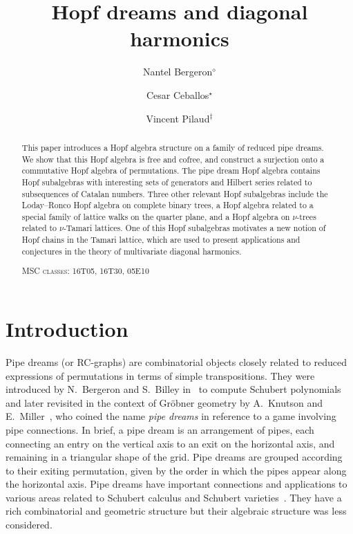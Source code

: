 \documentclass{amsart}
\title{Hopf dreams and diagonal harmonics}
\author[N.~Bergeron]{Nantel Bergeron$^{\diamond}$}
\author[C.~Ceballos]{Cesar Ceballos$^{\star}$}
\author[V.~Pilaud]{Vincent Pilaud$^{\ddagger}$}
\theoremstyle{definition}
\begin{document}
\begin{abstract}
This paper introduces a Hopf algebra structure on a family of reduced pipe dreams. 
We show that this Hopf algebra is free and cofree, and construct a surjection onto a commutative Hopf algebra of permutations. 
The pipe dream Hopf algebra contains Hopf subalgebras with interesting sets of generators and Hilbert series related to subsequences of Catalan numbers. 
Three other relevant Hopf subalgebras include 
the Loday--Ronco Hopf algebra on complete binary trees,
a Hopf algebra related to a special family of lattice walks on the quarter plane, and 
a Hopf algebra on $\nu$-trees related to $\nu$-Tamari lattices. 
One of this Hopf subalgebras motivates a new notion of Hopf chains in the Tamari lattice, which are used to present applications and conjectures 
in the theory of multivariate diagonal harmonics. 

\medskip
\noindent
\textsc{MSC classes}: 16T05, 16T30, 05E10
\end{abstract}

\maketitle

\tableofcontents


\section*{Introduction}

Pipe dreams (or RC-graphs) are combinatorial objects closely related to reduced expressions of permutations in terms of simple transpositions.
They were introduced by N.~Bergeron and S.~Billey in~\cite{BergeronBilley} to compute Schubert polynomials and later revisited in the context of Gr\"obner geometry by A.~Knutson and E.~Miller~\cite{KnutsonMiller-GroebnerGeometry}, who coined the name \emph{pipe dreams} in reference to a game involving pipe connections. In brief, a pipe dream is an arrangement of pipes, each connecting an entry on the vertical axis to an exit on the horizontal axis, and remaining in a triangular shape of the grid.
Pipe dreams are grouped according to their exiting permutation, given by the order in which the pipes appear along the horizontal axis.
Pipe dreams have important connections and applications to various areas related to Schubert calculus and Schubert varieties~\cite{LascouxSchutzenberger-PolynomesSchubert, LascouxSchutzenberger-SchubertLittlewoudRichardson}. 
They have a rich combinatorial and geometric structure but their algebraic structure was less considered.
\end{document}
